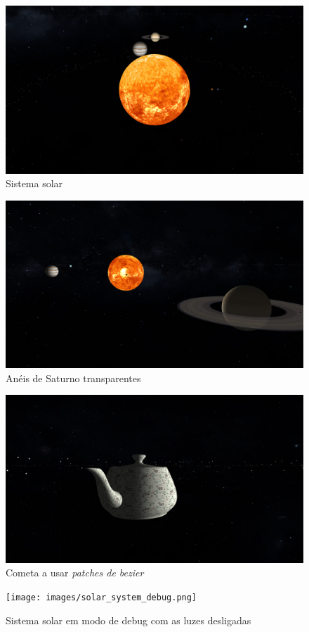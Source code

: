 \documentclass[a4paper]{report}
\begin{document}
\begin{figure}[H]
    \centering 
    \includegraphics[width=\textwidth]{images/solar_system.png}  
    \caption{Sistema solar}
\end{figure}
\begin{figure}[H]
    \centering 
    \includegraphics[width=\textwidth]{images/saturn_transparent.png}  
    \caption{Anéis de Saturno transparentes}
\end{figure}
\begin{figure}[H]
    \centering 
    \includegraphics[width=\textwidth]{images/teapot_space.png}  
    \caption{Cometa a usar \textit{patches de bezier}}
\end{figure}
\begin{figure}[H]
    \centering 
    \texttt{[image: images/solar\_system\_debug.png]}  
    \caption{Sistema solar em modo de debug com as luzes desligadas}
\end{figure}
\end{document}

